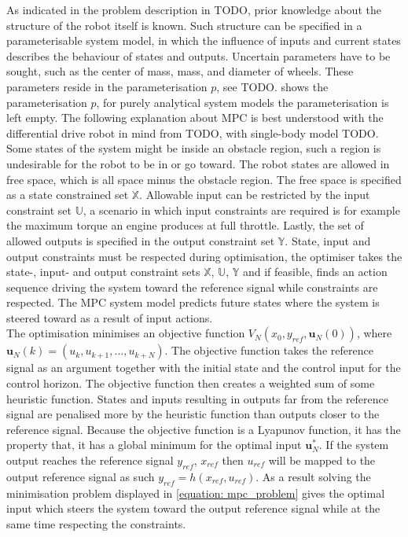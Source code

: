 As indicated in the problem description in TODO, prior knowledge about the structure of the robot itself is known. Such structure can be specified in a parameterisable system model, in which the influence of inputs and current states describes the behaviour of states and outputs. Uncertain parameters have to be sought, such as the center of mass, mass, and diameter of wheels. These parameters reside in the parameterisation $p$, see TODO.  shows the parameterisation $p$, for purely analytical system models the parameterisation is left empty. The following explanation about \ac{MPC} is best understood with the differential drive robot in mind from TODO, with single-body model TODO. Some states of the system might be inside an obstacle region, such a region is undesirable for the robot to be in or go toward. The robot states are allowed in free space, which is all space minus the obstacle region. The free space is specified as a state constrained set $\mathbb{X}$. Allowable input can be restricted by the input constraint set $\mathbb{U}$, a scenario in which input constraints are required is for example the maximum torque an engine produces at full throttle. Lastly, the set of allowed outputs is specified in the output constraint set $\mathbb{Y}$. State, input and output constraints must be respected during optimisation, the optimiser takes the state-, input- and output constraint sets $\mathbb{X}$, $\mathbb{U}$, $\mathbb{Y}$ and if feasible, finds an action sequence driving the system toward the reference signal while constraints are respected. The \ac{MPC} system model predicts future states where the system is steered toward as a result of input actions.\\

The optimisation minimises an objective function $V_{N}(x_{0}, y_{ref}, \mathbf{u}_{N}(0))$, where\\ $ \mathbf{u}_{N}(k) = (u_k, u_{k+1}, \dots , u_{k+N})$. The objective function takes the reference signal as an argument together with the initial state and the control input for the control horizon. The objective function then creates a weighted sum of some heuristic function. States and inputs resulting in outputs far from the reference signal are penalised more by the heuristic function than outputs closer to the reference signal. Because the objective function is a Lyapunov function, it has the property that, it has a global minimum for the optimal input $\mathbf{u}_{N}^*$. If the system output reaches the reference signal $y_{ref}$, $x_{ref}$ then $u_{ref}$ will be mapped to the output reference signal as such $y_{ref} = h(x_{ref}, u_{ref})$. As a result solving the minimisation problem displayed in \cref{equation: mpc_problem} gives the optimal input which steers the system toward the output reference signal while at the same time respecting the constraints. 



